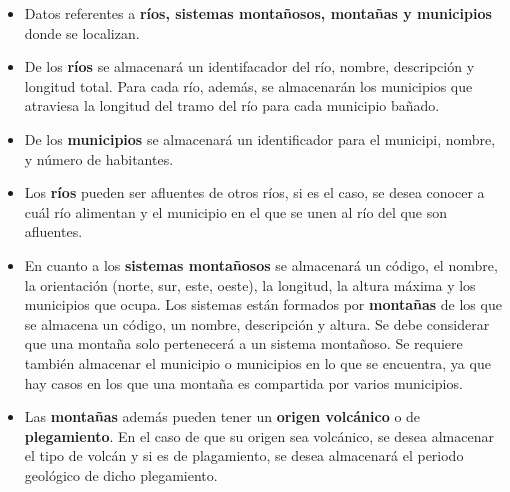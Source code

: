\documentclass[letterpaper,11pt]{article}
\begin{document}
\begin{itemize}
    \begin{itemize}
        \item Datos referentes a \textbf{ríos, sistemas montañosos, montañas y
              municipios} donde se localizan.
        \item De los \textbf{ríos} se almacenará un identifacador del río, nombre,
              descripción y longitud total. Para cada río, además, se almacenarán
              los municipios que atraviesa la longitud del tramo del río para cada
              municipio bañado.
        \item De los \textbf{municipios} se almacenará un identificador para
              el municipi, nombre, y número de habitantes.
        \item Los \textbf{ríos} pueden ser afluentes de otros ríos, si es el caso,
              se desea conocer a cuál río alimentan y el municipio en el que se unen
              al río del que son afluentes.
        \item En cuanto a los \textbf{sistemas montañosos} se almacenará un código,
              el nombre, la orientación (norte, sur, este, oeste), la longitud, la
              altura máxima y los municipios que ocupa. Los sistemas están formados
              por \textbf{montañas} de los que se almacena un código, un nombre,
              descripción y altura. Se debe considerar que una montaña solo
              pertenecerá a un sistema montañoso. Se requiere también almacenar
              el municipio o municipios en lo que se encuentra, ya que hay casos
              en los que una montaña es compartida por varios municipios.
        \item Las \textbf{montañas} además pueden tener un \textbf{origen volcánico}
              o de \textbf{plegamiento}. En el caso de que su origen sea volcánico,
              se desea almacenar el tipo de volcán y si es de plagamiento, se desea
              almacenará el periodo geológico de dicho plegamiento.


\end{itemize}
\end{itemize}
\end{document}
